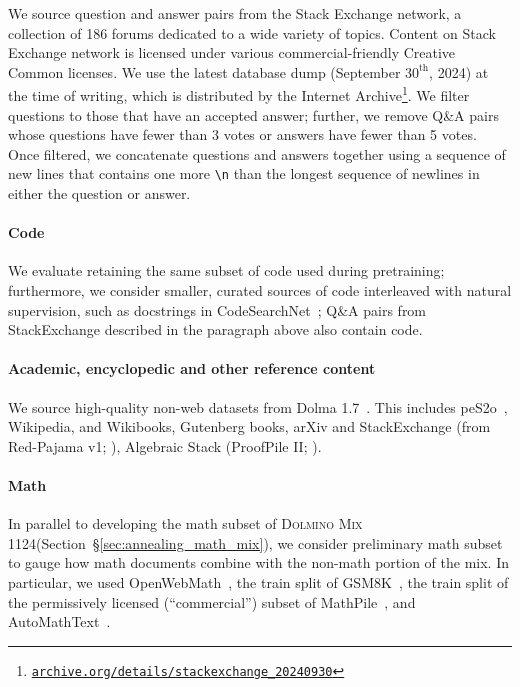 \documentclass[table]{ai2style/ai2}
\newcommand{\dolminos}{\textsc{Dolmino Mix 1124}\xspace}
\begin{document}
We source question and answer pairs from the Stack Exchange network, a collection of 186 forums dedicated to a wide variety of topics. 
Content on Stack Exchange network is licensed under various commercial-friendly Creative Common licenses. 
We use the latest database dump (September $\text{30}^\text{th}$, 2024) at the time of writing, which is distributed by the Internet Archive\footnote{\href{https://archive.org/details/stackexchange_20240930}{\texttt{archive.org/details/stackexchange\_20240930}}}.
We filter questions to those that have an accepted answer; further, we remove Q\&A pairs whose questions have fewer than 3 votes or answers have fewer than 5 votes. 
Once filtered, we concatenate questions and answers together using a sequence of new lines that contains one more \texttt{\textbackslash{n}} than the longest sequence of newlines in either the question or answer.

\paragraph{Code} We evaluate retaining the same subset of code used during pretraining;
furthermore, we consider smaller, curated sources of code interleaved with natural supervision, such as docstrings in CodeSearchNet~\citep{husain2019CodeSearchNet}; 
Q\&A pairs from StackExchange described in the paragraph above also contain code.

\paragraph{Academic, encyclopedic and other reference content} 
We source high-quality non-web datasets from Dolma 1.7~\citep{soldaini2024dolma}.
This includes peS2o~\citep{peS2o}, Wikipedia, and Wikibooks, Gutenberg books, arXiv and StackExchange (from Red-Pajama v1; \citealp{together2023redpajama}), Algebraic Stack (ProofPile II; \citealp{azerbayev2023llemma}).

\paragraph{Math}
In parallel to developing the math subset of \dolminos (Section~\S\ref{sec:annealing_math_mix}), we consider preliminary math subset to gauge how math documents combine with the non-math portion of the mix. 
In particular, we used OpenWebMath~\citep{paster2023openwebmath}, the train split of GSM8K~\citep{cobbe2021trainingverifierssolvemath}, the train split of the permissively licensed (``commercial'') subset of MathPile~\citep{wang2023mathpile}, and AutoMathText~\citep{zhang2024automathtext}.
\end{document}

